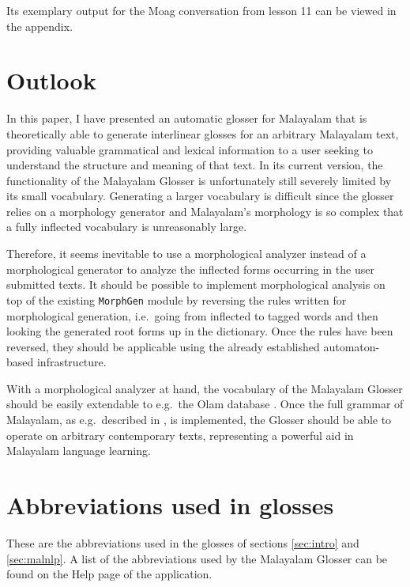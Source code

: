 \documentclass[a4paper]{article}
\newcommand{\typ}[1]{\texttt{#1}}
\begin{document}
Its exemplary output for the Moag conversation from lesson 11 can be viewed in the appendix.


\section{Outlook}

In this paper, I have presented an automatic glosser for Malayalam that is theoretically able to generate interlinear glosses for an arbitrary Malayalam text, providing valuable grammatical and lexical information to a user seeking to understand the structure and meaning of that text. In its current version, the functionality of the Malayalam Glosser is unfortunately still severely limited by its small vocabulary. Generating a larger vocabulary is difficult since the glosser relies on a morphology generator and Malayalam's morphology is so complex that a fully inflected vocabulary is unreasonably large.

Therefore, it seems inevitable to use a morphological analyzer instead of a morphological generator to analyze the inflected forms occurring in the user submitted texts. It should be possible to implement morphological analysis on top of the existing \typ{MorphGen} module by reversing the rules written for morphological generation, i.e.\ going from inflected to tagged words and then looking the generated root forms up in the dictionary. Once the rules have been reversed, they should be applicable using the already established automaton-based infrastructure.

With a morphological analyzer at hand, the vocabulary of the Malayalam Glosser should be easily extendable to e.g.\ the Olam database \parencite{olam}. Once the full grammar of Malayalam, as e.g.\ described in \textcite{asherKumari}, is implemented, the Glosser should be able to operate on arbitrary contemporary texts, representing a powerful aid in Malayalam language learning.


\printbibliography
\clearpage

\appendix

\section{Abbreviations used in glosses}

These are the abbreviations used in the glosses of sections \ref{sec:intro} and \ref{sec:malnlp}. A list of the abbreviations used by the Malayalam Glosser can be found on the Help page of the application.
\end{document}
